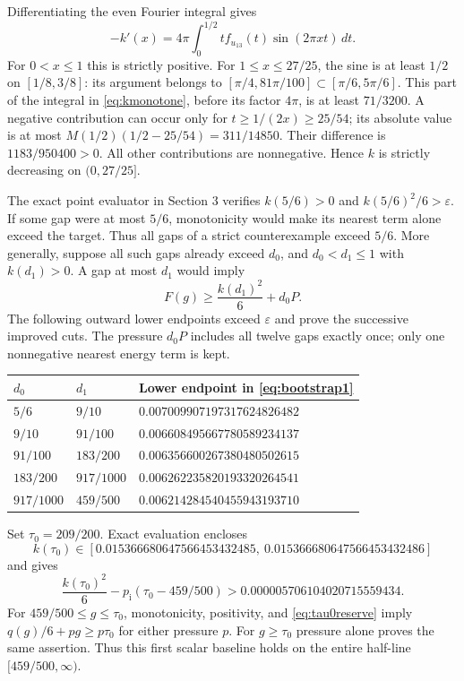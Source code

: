 \documentclass[11pt]{amsart}
\numberwithin{equation}{section}
\newcommand{\eps}{\varepsilon}
\newcommand{\pint}{p_{\mathrm i}}
\begin{document}
Differentiating the even Fourier integral gives
\begin{equation}\label{eq:kmonotone}
 -k'(x)=4\pi\int_0^{1/2}t f_{u_{13}}(t)\sin(2\pi xt)\,dt.
\end{equation}
For $0<x\leq1$ this is strictly positive. For
$1\leq x\leq27/25$, the sine is at least $1/2$ on
$[1/8,3/8]$: its argument belongs to
$[\pi/4,81\pi/100]\subset[\pi/6,5\pi/6]$.
This part of the integral in \eqref{eq:kmonotone}, before its
factor $4\pi$, is at least $71/3200$. A negative contribution can
occur only for $t\geq1/(2x)\geq25/54$; its absolute value is at
most $M(1/2)(1/2-25/54)=311/14850$. Their difference is
$1183/950400>0$. All other contributions are nonnegative. Hence
$k$ is strictly decreasing on $(0,27/25]$.

The exact point evaluator in Section 3 verifies
$k(5/6)>0$ and $k(5/6)^2/6>\eps$.
If some gap were at most $5/6$, monotonicity would make its nearest
term alone exceed the target. Thus all gaps of a strict
counterexample exceed $5/6$. More generally, suppose all such gaps
already exceed $d_0$, and $d_0<d_1\leq1$ with $k(d_1)>0$.
A gap at most $d_1$ would imply
\begin{equation}\label{eq:bootstrap1}
 F(g)\geq\frac{k(d_1)^2}{6}+d_0P.
\end{equation}
The following outward lower endpoints exceed $\eps$ and prove the
successive improved cuts. The pressure $d_0P$ includes all twelve
gaps exactly once; only one nonnegative nearest energy term is kept.
\begin{center}\small
\begin{tabular}{@{}lll@{}}
\toprule
$d_0$ & $d_1$ & Lower endpoint in \eqref{eq:bootstrap1}\\
\midrule
$5/6$ & $9/10$ & $0.007009907197317624826482$\\
$9/10$ & $91/100$ & $0.006608495667780589234137$\\
$91/100$ & $183/200$ & $0.006356600267380480502615$\\
$183/200$ & $917/1000$ & $0.006262235820193320264541$\\
$917/1000$ & $459/500$ & $0.006214284540455943193710$\\
\bottomrule
\end{tabular}
\end{center}

Set $\tau_0=209/200$. Exact evaluation encloses
\begin{equation}\label{eq:tau0value}
 k(\tau_0)\in
 [0.015366680647566453432485,\ 0.015366680647566453432486]
\end{equation}
and gives
\begin{equation}\label{eq:tau0reserve}
 \frac{k(\tau_0)^2}{6}-\pint(\tau_0-459/500)
       >0.000005706104020715559434.
\end{equation}
For $459/500\leq g\leq\tau_0$, monotonicity, positivity, and
\eqref{eq:tau0reserve} imply
$q(g)/6+pg\geq p\tau_0$ for either pressure $p$.
For $g\geq\tau_0$ pressure alone proves the same assertion.
Thus this first scalar baseline holds on the entire half-line
$[459/500,\infty)$.
\end{document}
